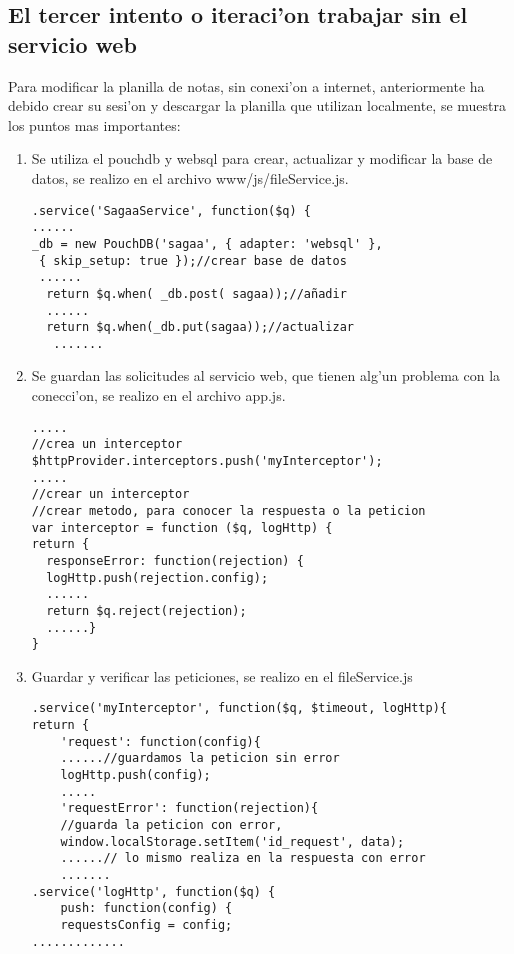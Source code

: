 \subsection{El tercer intento o iteraci'on trabajar sin el servicio web}
Para modificar la planilla de notas, sin conexi'on a internet, anteriormente ha debido crear su sesi'on y descargar la planilla que utilizan localmente, se muestra los puntos mas importantes:
\begin{enumerate}
\item Se utiliza el pouchdb y websql para crear, actualizar y modificar la base de datos, se realizo en el archivo www/js/fileService.js.
\begin{verbatim}
.service('SagaaService', function($q) {
......
_db = new PouchDB('sagaa', { adapter: 'websql' }, 
 { skip_setup: true });//crear base de datos
 ......
  return $q.when( _db.post( sagaa));//añadir
  ......
  return $q.when(_db.put(sagaa));//actualizar
   .......
\end{verbatim}
\item Se guardan las solicitudes al servicio web, que tienen alg'un problema con la conecci'on, se realizo en el archivo app.js.
\begin{verbatim}
.....
//crea un interceptor
$httpProvider.interceptors.push('myInterceptor');
.....
//crear un interceptor
//crear metodo, para conocer la respuesta o la peticion
var interceptor = function ($q, logHttp) {
return {
  responseError: function(rejection) {
  logHttp.push(rejection.config);
  ......
  return $q.reject(rejection);
  ......}
}
\end{verbatim}
\item Guardar y verificar las peticiones, se realizo en el fileService.js  
\begin{verbatim}
.service('myInterceptor', function($q, $timeout, logHttp){
return { 
	'request': function(config){ 
	......//guardamos la peticion sin error
	logHttp.push(config);
	.....
	'requestError': function(rejection){
	//guarda la peticion con error, 
	window.localStorage.setItem('id_request', data);
	......// lo mismo realiza en la respuesta con error
	.......
.service('logHttp', function($q) {
	push: function(config) {
	requestsConfig = config;
.............
\end{verbatim}
\end{enumerate}
